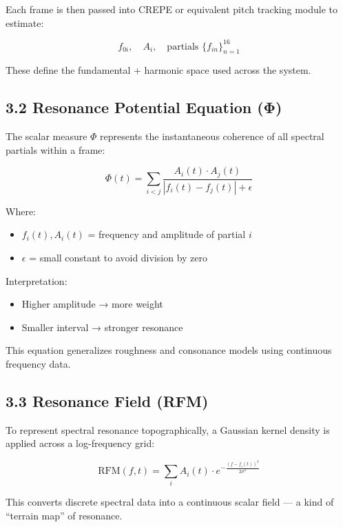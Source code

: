 \documentclass[10pt]{article}
\begin{document}
Each frame is then passed into CREPE or equivalent pitch tracking module to estimate:

\begin{equation}
f_{0i}, \quad A_i, \quad \text{partials } \{f_{in}\}_{n=1}^{16}
\end{equation}

These define the fundamental + harmonic space used across the system.

\subsection*{3.2 Resonance Potential Equation (Φ)}

The scalar measure $\Phi$ represents the instantaneous coherence of all spectral partials within a frame:

\begin{equation}
\Phi(t) = \sum_{i<j} \frac{A_i(t) \cdot A_j(t)}{|f_i(t) - f_j(t)| + \epsilon}
\end{equation}

Where:
\begin{itemize}
  \item $f_i(t), A_i(t)$ = frequency and amplitude of partial $i$
  \item $\epsilon$ = small constant to avoid division by zero
\end{itemize}

Interpretation:
\begin{itemize}
  \item Higher amplitude → more weight
  \item Smaller interval → stronger resonance
\end{itemize}

This equation generalizes roughness and consonance models using continuous frequency data.

\subsection*{3.3 Resonance Field (RFM)}

To represent spectral resonance topographically, a Gaussian kernel density is applied across a log-frequency grid:

\begin{equation}
\text{RFM}(f, t) = \sum_i A_i(t) \cdot e^{-\frac{(f - f_i(t))^2}{2\sigma^2}}
\end{equation}

This converts discrete spectral data into a continuous scalar field — a kind of “terrain map” of resonance.
\end{document}
